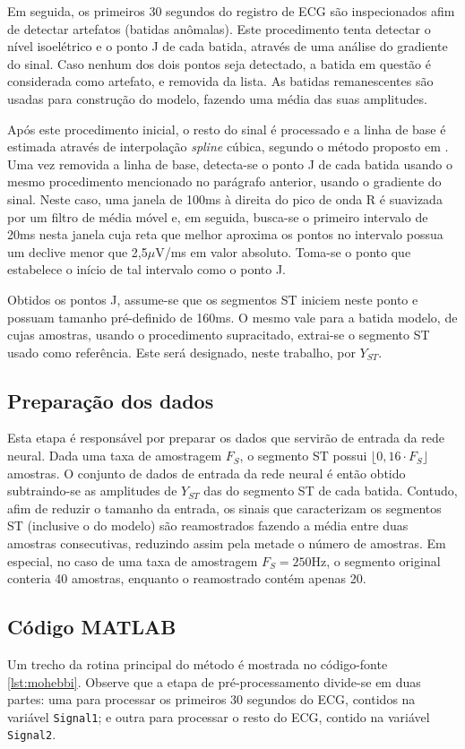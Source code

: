 Em seguida, os primeiros 30 segundos do registro de ECG são inspecionados afim de detectar artefatos (batidas anômalas). Este procedimento tenta detectar o nível isoelétrico e o ponto J de cada batida, através de uma análise do gradiente do sinal. Caso nenhum dos dois pontos seja detectado, a batida em questão é considerada como artefato, e removida da lista. As batidas remanescentes são usadas para construção do modelo, fazendo uma média das suas amplitudes.

Após este procedimento inicial, o resto do sinal é processado e a linha de base é estimada através de interpolação \emph{spline} cúbica, segundo o método proposto em \cite{Badilini91}. Uma vez removida a linha de base, detecta-se o ponto J de cada batida usando o mesmo procedimento mencionado no parágrafo anterior, usando o gradiente do sinal. Neste caso, uma janela de 100ms à direita do pico de onda R é suavizada por um filtro de média móvel e, em seguida, busca-se o primeiro intervalo de 20ms nesta janela cuja reta que melhor aproxima os pontos no intervalo possua um declive menor que 2,5$\mu$V/ms em valor absoluto. Toma-se o ponto que estabelece o início de tal intervalo como o ponto J.

Obtidos os pontos J, assume-se que os segmentos ST iniciem neste ponto e possuam tamanho pré-definido de 160ms. O mesmo vale para a batida modelo, de cujas amostras, usando o procedimento supracitado, extrai-se o segmento ST usado como referência. Este será designado, neste trabalho, por $Y_{ST}$.

\subsection{Preparação dos dados}
Esta etapa é responsável por preparar os dados que servirão de entrada da rede neural. Dada uma taxa de amostragem $F_S$, o segmento ST possui $\lfloor0,16\cdot F_S\rfloor$ amostras. O conjunto de dados de entrada da rede neural é então obtido subtraindo-se as amplitudes de $Y_{ST}$ das do segmento ST de cada batida. Contudo, afim de reduzir o tamanho da entrada, os sinais que caracterizam os segmentos ST (inclusive o do modelo) são reamostrados fazendo a média entre duas amostras consecutivas, reduzindo assim pela metade o número de amostras. Em especial, no caso de uma taxa de amostragem $F_S = 250\mathrm{Hz}$, o segmento original conteria 40 amostras, enquanto o reamostrado contém apenas 20.

\subsection{Código MATLAB}
Um trecho da rotina principal do método é mostrada no código-fonte \ref{lst:mohebbi}. Observe que a etapa de pré-processamento divide-se em duas partes: uma para processar os primeiros 30 segundos do ECG, contidos na variável \texttt{Signal1}; e outra para processar o resto do ECG, contido na variável \texttt{Signal2}.


